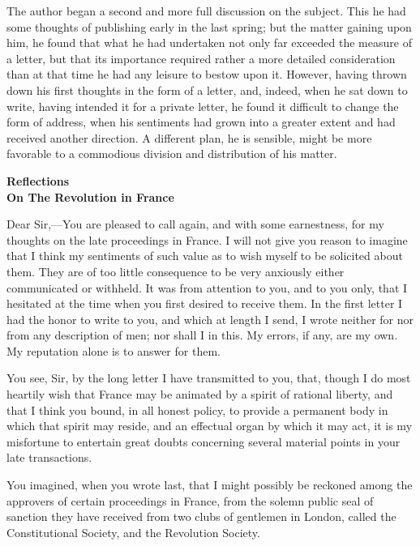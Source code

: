 The author began a second and more full discussion on the subject. This he had some thoughts of publishing early in the last spring; but the matter gaining upon him, he found that what he had undertaken not only far exceeded the measure of a letter, but that its importance required rather a more detailed consideration than at that time he had any leisure to bestow upon it. However, having thrown down his first thoughts in the form of a letter, and, indeed, when he sat down to write, having intended it for a private letter, he found it difficult to change the form of address, when his sentiments had grown into a greater extent and had received another direction. A different plan, he is sensible, might be more favorable to a commodious division and distribution of his matter.

\begin{center}
  \textbf{{\large Reflections} \\On {\large The Revolution in France}} \par 
\end{center}

\PRLsep

Dear Sir,—You are pleased to call again, and with some earnestness, for my thoughts on the late proceedings in France. I will not give you reason to imagine that I think my sentiments of such value as to wish myself to be solicited about them. They are of too little consequence to be very anxiously either communicated or withheld. It was from attention to you, and to you only, that I hesitated at the time when you first desired to receive them. In the first letter I had the honor to write to you, and which at length I send, I wrote neither for nor from any description of men; nor shall I in this. My errors, if any, are my own. My reputation alone is to answer for them.

You see, Sir, by the long letter I have transmitted to you, that, though I do most heartily wish that France may be animated by a spirit of rational liberty, and that I think you bound, in all honest policy, to provide a permanent body in which that spirit may reside, and an effectual organ by which it may act, it is my misfortune to entertain great doubts concerning several material points in your late transactions.

You imagined, when you wrote last, that I might possibly be reckoned among the approvers of certain proceedings in France, from the solemn public seal of sanction they have received from two clubs of gentlemen in London, called the Constitutional Society, and the Revolution Society.

